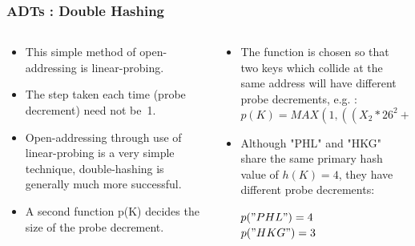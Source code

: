 
\begin{frame}[fragile]
\frametitle{ADTs : Double Hashing}
\begin{columns}[T]

\begin{column}{0.35\textwidth}
\begin{itemize}[<+->]
\item This simple method of open-addressing is linear-probing.
\item The step taken each time (probe decrement) need not be~1.
\item Open-addressing through use of linear-probing is a very simple technique, double-hashing is generally much more successful.
\item A second function p(K) decides the size of the probe decrement.
\end{itemize}
\end{column}

\pause
\begin{column}{0.55\textwidth}
\begin{itemize}[<+->]
\item The function is chosen so that two keys which collide at the same address will have different probe decrements, e.g. :
{\small
\[
p(K) = MAX (1, ((X_2*26^2 + X_1*26+X_0)/11)\%11)
\]
}
\item Although "PHL" and "HKG" share the same primary hash value of $h(K)=4$, they
have different probe decrements:

$p("PHL")=4$\\

$p("HKG")=3$
\end{itemize}
\end{column}

\end{columns}
\end{frame}



